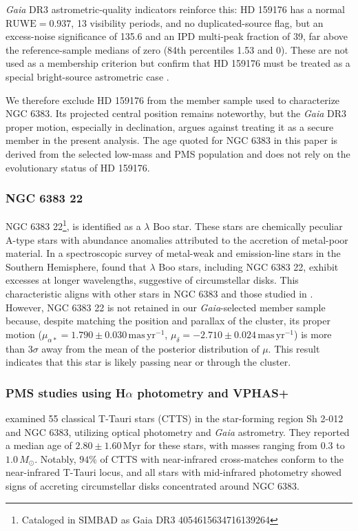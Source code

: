 \documentclass{aa}
\begin{document}
\textit{Gaia} DR3 astrometric-quality indicators reinforce this: HD 159176 has a normal $\mathrm{RUWE}=0.937$, 13 visibility periods, and no duplicated-source flag, but an excess-noise significance of 135.6 and an IPD multi-peak fraction of 39, far above the reference-sample medians of zero (84th percentiles 1.53 and 0). These are not used as a membership criterion but confirm that HD 159176 must be treated as a special bright-source astrometric case \citep{2022MNRAS.510.2597R}.

We therefore exclude HD 159176 from the member sample used to characterize NGC 6383. Its projected central position remains noteworthy, but the \textit{Gaia} DR3 proper motion, especially in declination, argues against treating it as a secure member in the present analysis. The age quoted for NGC 6383 in this paper is derived from the selected low-mass and PMS population and does not rely on the evolutionary status of HD 159176.

\subsubsection{NGC 6383 22}
NGC 6383 22\footnote{Cataloged in SIMBAD as Gaia DR3 4054615634716139264}, is identified as a $\lambda$ Boo star. These stars are chemically peculiar A-type stars with abundance anomalies attributed to the accretion of metal-poor material. In a spectroscopic survey of metal-weak and emission-line stars in the Southern Hemisphere, \citet{2020MNRAS.499.2701M} found that $\lambda$ Boo stars, including NGC 6383 22, exhibit excesses at longer wavelengths, suggestive of circumstellar disks. This characteristic aligns with other stars in NGC 6383 and those studied in \citet{2019MNRAS.484.5102K}. However, NGC 6383 22 is not retained in our \textit{Gaia}-selected member sample because, despite matching the position and parallax of the cluster, its proper motion ($\mu_{\alpha*} = 1.790 \pm 0.030\,\mathrm{mas\,yr^{-1}}$, $\mu_{\delta} = -2.710 \pm 0.024\,\mathrm{mas\,yr^{-1}}$) is more than $3\sigma$ away from the mean of the posterior distribution of $\mu$. This result indicates that this star is likely passing near or through the cluster.

\subsubsection{PMS studies using \texorpdfstring{H$\alpha$}{H-alpha} photometry and VPHAS+}

\citet{2019MNRAS.484.5102K} examined 55 classical T-Tauri stars (CTTS) in the star-forming region Sh 2-012 and NGC 6383, utilizing optical photometry and \textit{Gaia} astrometry. They reported a median age of $2.80 \pm 1.60\,\mathrm{Myr}$ for these stars, with masses ranging from $0.3$ to $1.0\,M_\odot$. Notably, $94\%$ of CTTS with near-infrared cross-matches conform to the near-infrared T-Tauri locus, and all stars with mid-infrared photometry showed signs of accreting circumstellar disks concentrated around NGC 6383.
\end{document}
